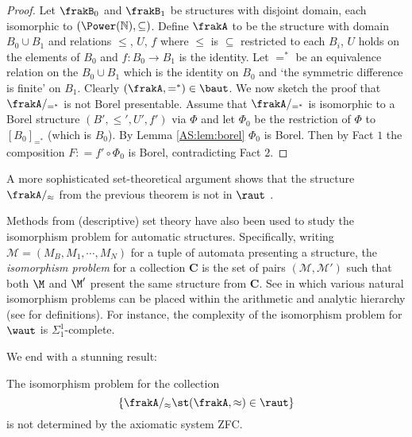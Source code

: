 \begin{proof}
Let $\frakB_0$ and $\frakB_1$ be structures with disjoint domain, each isomorphic to $(\Power(\mathbb{N}),\subseteq)$.
Define $\frakA$ to be the structure with domain $B_0 \cup B_1$ and relations $\leq$, $U$, $f$ where $\leq$ is
$\subseteq$ restricted to each $B_i$, $U$ holds on the elements of $B_0$ and $f:B_0 \to B_1$ is the identity. Let $=^*$ be an equivalence
relation on the $B_0 \cup B_1$ which is the identity on $B_0$ and `the symmetric difference is finite' on $B_1$. Clearly 
$(\frakA,=^*) \in \baut$. We now sketch the proof that $\frakA/_{=^*}$ is not Borel presentable. 
Assume that $\frakA/_{=^*}$ is isomorphic to a Borel structure $(B',\leq',U',f')$ via $\Phi$ and let $\Phi_0$ be the restriction of 
$\Phi$ to $[B_0]_{=^*}$ (which is $B_0$). By Lemma \ref{AS:lem:borel} $\Phi_0$ is Borel.
Then  by Fact $1$ the composition $F: = f' \circ \Phi_0$ is Borel, contradicting Fact $2$.
\end{proof}

A more sophisticated set-theoretical argument shows that the structure $\frakA/_{\approx}$ from the previous theorem is not in $\raut$ \cite{HKMN08}.

Methods from (descriptive) set theory have also been used to study the isomorphism problem for automatic structures.
Specifically, writing $\mathcal{M} = (M_B,M_1,\cdots,M_N)$ for a tuple of automata presenting a structure, the {\em isomorphism problem} for a collection
$\mathbf{C}$ is the set of pairs $(\mathcal{M},\mathcal{M'})$ such that both $\M$ and $\M'$ present the same structure from $\mathbf{C}$. See \cite{Rubi04,KLL10CSL,KLL10LICS} in which various natural isomorphism problems can be placed within the arithmetic and analytic hierarchy (see \cite{Roge67} for definitions). For instance, the complexity of the
isomorphism problem for $\waut$ is $\Sigma^1_1$-complete.

We end with a stunning result:

\begin{theorem}
The isomorphism problem for the collection 
\[
\{\frakA/_\approx \st (\frakA,\approx) \in \raut\}
\]
is not determined by the axiomatic system \textrm{ZFC}.
\end{theorem}

